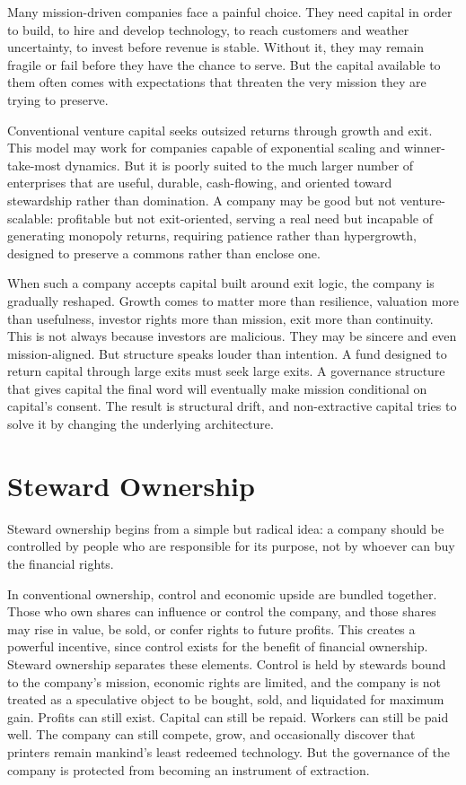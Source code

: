 \documentclass[11pt,a4paper,oneside]{book}
\begin{document}
Many mission-driven companies face a painful choice. They need capital in order to build, to hire and develop technology, to reach customers and weather uncertainty, to invest before revenue is stable. Without it, they may remain fragile or fail before they have the chance to serve. But the capital available to them often comes with expectations that threaten the very mission they are trying to preserve.

Conventional venture capital seeks outsized returns through growth and exit. This model may work for companies capable of exponential scaling and winner-take-most dynamics. But it is poorly suited to the much larger number of enterprises that are useful, durable, cash-flowing, and oriented toward stewardship rather than domination. A company may be good but not venture-scalable: profitable but not exit-oriented, serving a real need but incapable of generating monopoly returns, requiring patience rather than hypergrowth, designed to preserve a commons rather than enclose one.

When such a company accepts capital built around exit logic, the company is gradually reshaped. Growth comes to matter more than resilience, valuation more than usefulness, investor rights more than mission, exit more than continuity. This is not always because investors are malicious. They may be sincere and even mission-aligned. But structure speaks louder than intention. A fund designed to return capital through large exits must seek large exits. A governance structure that gives capital the final word will eventually make mission conditional on capital's consent. The result is structural drift, and non-extractive capital tries to solve it by changing the underlying architecture.

\section*{Steward Ownership}

Steward ownership begins from a simple but radical idea: a company should be controlled by people who are responsible for its purpose, not by whoever can buy the financial rights.

In conventional ownership, control and economic upside are bundled together. Those who own shares can influence or control the company, and those shares may rise in value, be sold, or confer rights to future profits. This creates a powerful incentive, since control exists for the benefit of financial ownership. Steward ownership separates these elements. Control is held by stewards bound to the company's mission, economic rights are limited, and the company is not treated as a speculative object to be bought, sold, and liquidated for maximum gain. Profits can still exist. Capital can still be repaid. Workers can still be paid well. The company can still compete, grow, and occasionally discover that printers remain mankind's least redeemed technology. But the governance of the company is protected from becoming an instrument of extraction.
\end{document}
